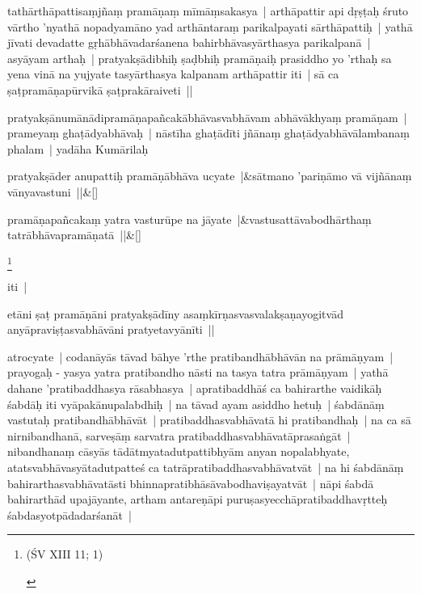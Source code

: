 \documentclass[article,12pt,a4paper]{memoir}%
\newcounter{parCount}
\begin{document}
	  \pstart \leavevmode%
	\label{thakur75-99.1}tathārthāpattisaṃjñaṃ pramāṇaṃ mīmāṃsakasya | arthāpattir api dṛṣṭaḥ śruto vārtho 'nyathā nopadyamāno yad arthāntaraṃ parikalpayati sārthāpattiḥ | yathā jīvati devadatte gṛhābhāvadarśanena bahirbhāvasyārthasya parikalpanā | asyāyam arthaḥ | pratyakṣādibhiḥ ṣaḍbhiḥ pramāṇaiḥ prasiddho yo 'rthaḥ sa yena vinā na yujyate tasyārthasya kalpanam arthāpattir iti | sā ca ṣaṭpramāṇapūrvikā ṣaṭprakāraiveti ||
	{}
	\pend%
      

	  \pstart \leavevmode%
	\label{thakur75-99.6}pratyakṣānumānādipramāṇapañcakābhāvasvabhāvam abhāvākhyaṃ pramāṇam | prameyaṃ ghaṭādyabhāvaḥ | nāstīha ghaṭādīti jñānaṃ ghaṭādyabhāvālambanaṃ phalam | yadāha Kumārilaḥ
	{}
	\pend%
      
	    
	    \stanza[\smallbreak]
	  pratyakṣāder anupattiḥ pramāṇābhāva ucyate |&sātmano 'pariṇāmo vā vijñānaṃ vānyavastuni ||\&[\smallbreak]
	  
	  
	  
	    
	    \stanza[\smallbreak]
	  pramāṇapañcakaṃ yatra vasturūpe na jāyate |&vastusattāvabodhārthaṃ tatrābhāvapramāṇatā ||\&[\smallbreak]
	  
	  
	  \footnote{\begin{english}(ŚV XIII 11; 1)\end{english}}

	  \pstart \leavevmode%
	iti | 
	{}
	\pend%
      

	  \pstart \leavevmode%
	etāni ṣaṭ pramāṇāni pratyakṣādīny asaṃkīrṇasvasvalakṣaṇayogitvād anyāpraviṣṭasvabhāvāni pratyetavyānīti ||
	{}
	\pend%
      

	  \pstart \leavevmode%
	\label{thakur75-99.15}atrocyate | codanāyās tāvad bāhye 'rthe pratibandhābhāvān na prāmāṇyam | prayogaḥ - yasya yatra pratibandho nāsti na tasya tatra prāmāṇyam | yathā dahane 'pratibaddhasya rāsabhasya | apratibaddhāś ca bahirarthe vaidikāḥ śabdāḥ iti vyāpakānupalabdhiḥ | na tāvad ayam asiddho hetuḥ | śabdānāṃ vastutaḥ pratibandhābhāvāt | pratibaddhasvabhāvatā hi pratibandhaḥ | na ca sā nirnibandhanā, sarveṣāṃ sarvatra pratibaddhasvabhāvatāprasaṅgāt | nibandhanaṃ cāsyās tādātmyatadutpattibhyām anyan nopalabhyate, atatsvabhāvasyātadutpatteś ca tatrāpratibaddhasvabhāvatvāt | na hi śabdānāṃ bahirarthasvabhāvatāsti bhinnapratibhāsāvabodhaviṣayatvāt | nāpi śabdā bahirarthād upajāyante, artham antareṇāpi puruṣasyecchāpratibaddhavṛtteḥ śabdasyotpādadarśanāt |
	{}
	\pend%
      
\end{document}

